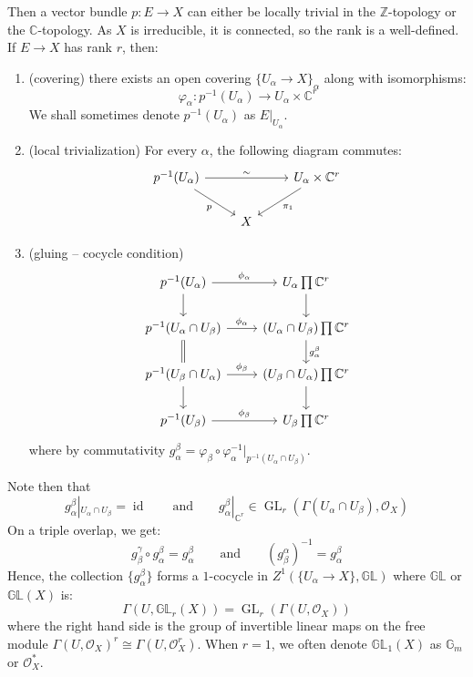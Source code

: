 \documentclass{book}
\newcommand{\C}{{\mathbb{C}}}
\newcommand{\Z}{{\mathbb{Z}}}
\newcommand{\BG}{{\mathbb{G}}}
\newcommand{\BGL}{{\mathbb{GL}}}
\newcommand{\CO}{{\mathcal{O}}}
\newcommand{\id}{{\operatorname{id}}}
\newcommand{\GL}{{\operatorname{GL}}}
\let\temp\phi
\let\phi\varphi
\let\varphi\temp
\begin{document}
Then a vector bundle $p: E \to X$ can either be locally trivial in the $\Z$-topology or the $\C$-topology. As $X$
is irreducible, it is connected, so the rank is a well-defined. If $E \to X$ has rank $r$, then:
\begin{enumerate}
  \item (covering) there exists an open covering $\{U_\alpha \to X\}_\alpha$ along with isomorphisms:
    \[
      \phi_\alpha: p^{-1}(U_\alpha) \to U_\alpha \times \C^r
    \]
    We shall sometimes denote $p^{-1}(U_\alpha)$ as $E|_{U_\alpha}$.
   \item (local trivialization) For every $\alpha$, the following diagram commutes:
     \[
     \begin{tikzcd}
     p^{-1}(U_\alpha) \arrow[rd, "p"'] \arrow[rr, "\sim"] &   & U_\alpha \times \C^r \arrow[ld, "\pi_1"] \\
                                                          & X &
     \end{tikzcd}
     \]
   \item (gluing -- cocycle condition)
    \[
    \begin{tikzcd}
    p^{-1}(U_\alpha) \arrow[r, "\varphi_\alpha"] \arrow[d] & U_\alpha \prod \mathbb{C}^r \arrow[d] \\
    p^{-1}(U_\alpha \cap U_\beta) \arrow[r, "\varphi_\alpha"] \arrow[d, equal] & (U_\alpha \cap U_\beta) \prod \mathbb{C}^r \arrow[d, "g_\alpha^\beta"] \\
    p^{-1}(U_\beta \cap U_\alpha) \arrow[r, "\varphi_\beta"] \arrow[d] & (U_\beta \cap U_\alpha) \prod \mathbb{C}^r \arrow[d] \\
    p^{-1}(U_\beta) \arrow[r, "\varphi_\beta"] & U_\beta \prod \mathbb{C}^r
    \end{tikzcd}
    \]
    where by commutativity $g_\alpha^\beta = \phi_\beta \circ \phi^{-1}_\alpha|_{p^{-1}(U_\alpha\cap
    U_\beta)}$.
\end{enumerate}

Note then that
\[
  g_\alpha^\beta|_{U_\alpha\cap U_\beta} = \id \qquad \text{and} \qquad g_\alpha^\beta|_{\C^r} \in
  \GL_r(\Gamma(U_\alpha\cap U_\beta), \CO_X)
\]
On a triple overlap, we get:
\[
  g_\beta^\gamma\circ g_\alpha^\beta = g_\alpha^\beta \qquad \text{and} \qquad (g_\beta^\alpha)^{-1}
  = g_\alpha^\beta
\]
Hence, the collection $\{g_\alpha^\beta\}$ forms a $1$-cocycle in $Z^1(\{U_\alpha \to X\},\BGL)$ where
$\BGL$ or $\BGL(X)$ is:
\[
  \Gamma(U, \BGL_r(X)) = \GL_r(\Gamma(U, \CO_X))
\]
where the right hand side is the group of invertible linear maps on the free module $\Gamma(U, \CO_X)^r
\cong \Gamma(U, \CO_X^r)$. When $r = 1$, we often denote $\BGL_1(X)$ as $\BG_m$ or $\CO_X^*$.
\end{document}
